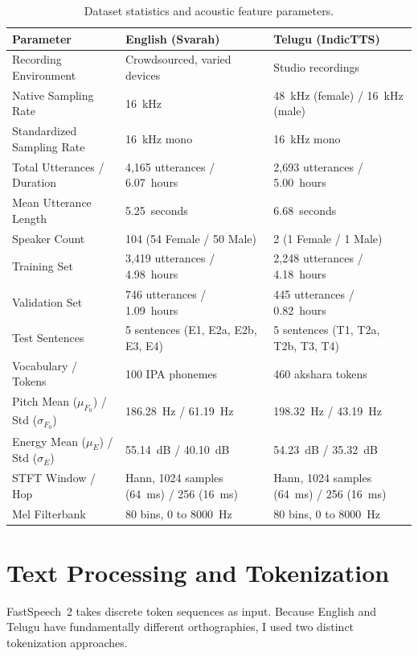 \documentclass[11pt,a4paper]{report}
\begin{document}
\begin{table}[!htbp]
\centering
\caption{Dataset statistics and acoustic feature parameters.}
\label{tab:dataset_stats}
\small
\begin{tabularx}{\textwidth}{lXX}
\toprule
\textbf{Parameter} & \textbf{English (Svarah)} & \textbf{Telugu (IndicTTS)} \\
\midrule
Recording Environment & Crowdsourced, varied devices & Studio recordings \\
Native Sampling Rate & 16~kHz & 48~kHz (female) / 16~kHz (male) \\
Standardized Sampling Rate & 16~kHz mono & 16~kHz mono \\
Total Utterances / Duration & 4{,}165 utterances / 6.07~hours & 2{,}693 utterances / 5.00~hours \\
Mean Utterance Length & 5.25~seconds & 6.68~seconds \\
Speaker Count & 104 (54 Female / 50 Male) & 2 (1 Female / 1 Male) \\
\midrule
Training Set & 3{,}419 utterances / 4.98~hours & 2{,}248 utterances / 4.18~hours \\
Validation Set & 746 utterances / 1.09~hours & 445 utterances / 0.82~hours \\
Test Sentences & 5 sentences (E1, E2a, E2b, E3, E4) & 5 sentences (T1, T2a, T2b, T3, T4) \\
\midrule
Vocabulary / Tokens & 100 IPA phonemes & 460 akshara tokens \\
Pitch Mean ($\mu_{F_0}$) / Std ($\sigma_{F_0}$) & 186.28~Hz / 61.19~Hz & 198.32~Hz / 43.19~Hz \\
Energy Mean ($\mu_E$) / Std ($\sigma_E$) & 55.14~dB / 40.10~dB & 54.23~dB / 35.32~dB \\
STFT Window / Hop & Hann, 1024 samples (64~ms) / 256 (16~ms) & Hann, 1024 samples (64~ms) / 256 (16~ms) \\
Mel Filterbank & 80 bins, 0 to 8000~Hz & 80 bins, 0 to 8000~Hz \\
\bottomrule
\end{tabularx}
\end{table}

\FloatBarrier
\vspace{1.5em}

\section{Text Processing and Tokenization}
FastSpeech~2 takes discrete token sequences as input. Because English and Telugu have fundamentally different orthographies, I used two distinct tokenization approaches.
\end{document}
